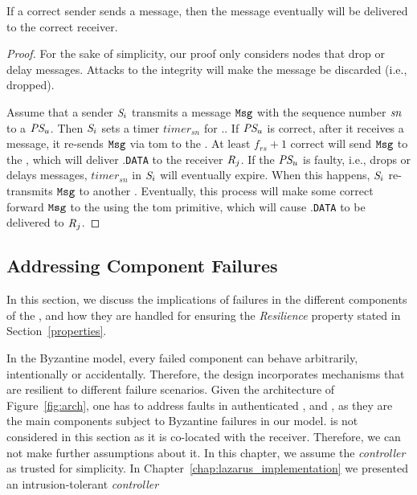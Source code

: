 \begin{liveness}
If a correct sender sends a message, then the message eventually will be delivered to the correct receiver.
\end{liveness}

\begin{proof}
For the sake of simplicity, our proof only considers nodes that drop or delay messages.
Attacks to the integrity will make the message be discarded (i.e., dropped).

Assume that a sender $\emph{S}_i$ transmits a message $\texttt{Msg}$ with the sequence number $\emph{sn}$ to a \presieve $\emph{PS}_u$.
Then $\emph{S}_i$ sets a timer $timer_{sn}$ for \msg.\sn.
If $\emph{PS}_u$ is correct, after it receives a message, it re-sends $\texttt{Msg}$ via \gls{tom} to the \repsieves.
At least $f_{rs}+1$ correct \repsieves will send $\texttt{Msg}$ to the \postsieve, which will deliver  \msg.\texttt{DATA} to the receiver $\emph{R}_j$.
If the $\emph{PS}_u$ is faulty, i.e., drops or delays messages, $timer_{sn}$ in $\emph{S}_i$ will eventually expire.
When this happens, $\emph{S}_i$ re-transmits $\texttt{Msg}$ to another \presieve.
Eventually, this process will make some correct \presieve forward $\texttt{Msg}$ to the \repsieves using the \gls{tom} primitive, which will cause \msg.\texttt{DATA} to be delivered to $\emph{R}_j$.
\end{proof}


\subsection{Addressing Component Failures}
\label{sec:failures}

In this section, we discuss the implications of failures in the different components of the \sieveq, and how they are handled for ensuring the \emph{Resilience} property stated in Section~\ref{properties}.

In the Byzantine model, every failed component can behave arbitrarily, intentionally or accidentally. Therefore, the \sieveq design incorporates mechanisms that are resilient to different failure scenarios. 
Given the architecture of Figure~\ref{fig:arch}, one has to address faults in authenticated \senders, \presieves and \repsieves, as they are the main components subject to Byzantine failures in our model. 
\Postsieve is not considered in this section as it is co-located with the receiver.
Therefore, we can not make further assumptions about it. 
In this chapter, we assume the \emph{controller} as trusted for simplicity.
In Chapter~\ref{chap:lazarus_implementation} we presented an intrusion-tolerant \emph{controller}


